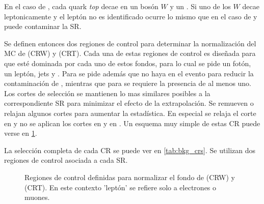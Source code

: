 En el caso de {\ttgam}, cada quark \emph{top} decae en un bosón $W$ y un
{\bjet}. Si uno de los $W$ decae leptonicamente y el leptón no es identificado
ocurre lo mismo que en el caso de {\wgam} y puede contaminar la SR.

Se definen entonces dos regiones de control para determinar la normalización del
MC de {\wgam} (CRW) y {\ttgam} (CRT). Cada una de estas regiones de control es
diseñada para que esté dominada por cada uno de estos fondos, para lo cual se
pide un fotón, un leptón, jets y \met. Para {\CRW} se pide además que no haya
{\bjets} en el evento para reducir la contaminación de {\ttgam}, mientras que
para {\CRT} se requiere la presencia de al menos uno.
Los cortes de selección se mantienen lo
mas similares posibles a la correspondiente SR para minimizar el efecto de la
extrapolación.
Se remueven o relajan
algunos cortes para aumentar la estadística. En especial se relaja el corte en
{\met} y no se aplican los cortes en {\HT} y en {\rt}. Un esquema muy simple de
estas CR puede verse en \cref{fig:bkg_crt_crw}.

La selección completa de cada CR se puede ver en \cref{tab:bkg_crs}. Se utilizan
dos regiones de control asociada a cada SR.

\begin{figure}[!htbp]
  \centering

  \resizebox{0.5\textwidth}{!}{}

  \caption{Regiones de control definidas para normalizar el fondo de {\wgam} (CRW) y {\ttgam} (CRT). En este contexto 'leptón' se refiere solo a electrones o muones.}
  \label{fig:bkg_crt_crw}
\end{figure}



